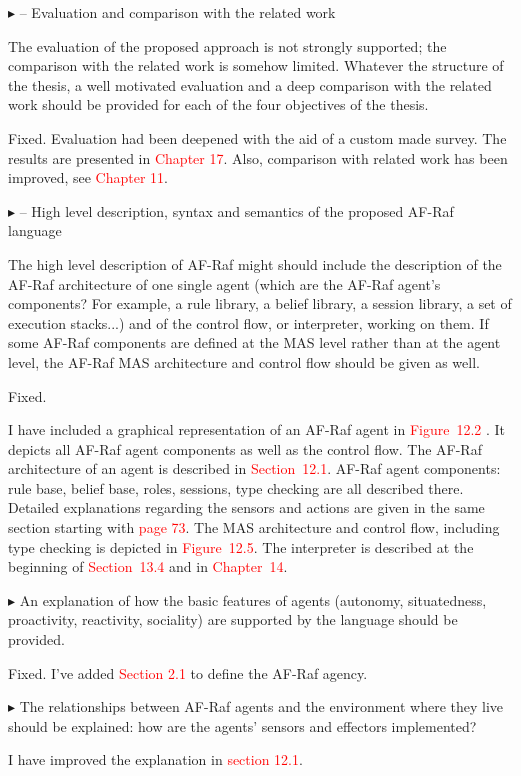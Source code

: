 \documentclass{article}
\newcommand*\R[1]{\textcolor{red}{#1}} %
\newenvironment{them}%
  {\bigskip\noindent\begingroup\color{blue}$\blacktriangleright$\enspace}%
  {\endgroup\par}
\begin{document}
\begin{them}
-- Evaluation and comparison with the related work

The evaluation of the proposed approach is not strongly supported; the
comparison with the related work is somehow limited. Whatever the structure of
the thesis, a well motivated evaluation and a deep comparison with the related
work should be provided for each of the four objectives of the thesis.
\end{them}
Fixed. Evaluation had been deepened with the aid of a custom made survey. The
results are presented in \R{Chapter 17}. Also, comparison with related work has
been improved, see \R{Chapter 11}.

\begin{them}
-- High level description, syntax and semantics of the proposed AF-Raf language

The high level description of AF-Raf might should include the description of
the AF-Raf architecture of one single agent (which are the AF-Raf agent's
components? For example, a rule library, a belief library, a session library, a
set of execution stacks...) and of the control flow, or interpreter, working on
them. If some AF-Raf components are defined at the MAS level rather than at the
agent level, the AF-Raf MAS architecture and control flow should be given as
well.
\end{them}
Fixed.

I have included a graphical representation of an AF-Raf agent in \R{Figure~12.2
}. It depicts all AF-Raf agent components as well as the control flow. The
AF-Raf architecture of an agent is described in \R{Section~12.1}. AF-Raf agent
components: rule base, belief base, roles, sessions, type checking are all
described there. Detailed explanations regarding the sensors and actions are
given in the same section starting with \R{page 73}. The MAS architecture and
control flow, including type checking is depicted in \R{Figure~12.5}. The
interpreter is described at the beginning of \R{Section~13.4} and in
\R{Chapter~14}.

\begin{them}
An explanation of how the basic features of agents (autonomy, situatedness,
proactivity, reactivity, sociality) are supported by the language should be
provided. 
\end{them}
Fixed. I've added \R{Section 2.1} to define the AF-Raf agency.

\begin{them}
The relationships between AF-Raf agents and the environment where
they live should be explained: how are the agents' sensors and effectors
implemented? 
\end{them}
I have improved the explanation in \R{section 12.1}.
\end{document}
